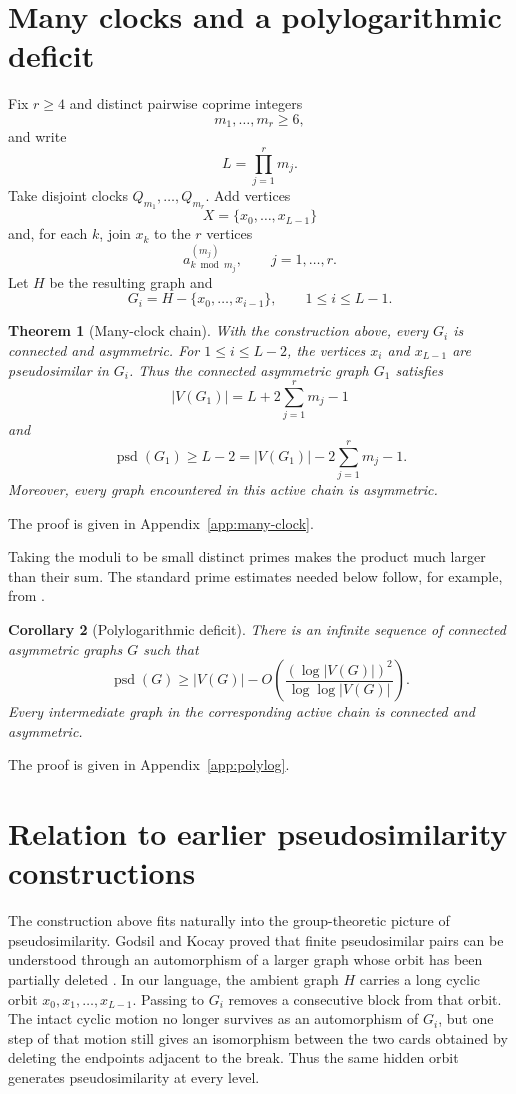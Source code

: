 \documentclass[11pt]{article}
\newtheorem{theorem}{Theorem}[section]
\newtheorem{corollary}[theorem]{Corollary}
\theoremstyle{definition}
\theoremstyle{remark}
\newcommand{\psd}{\operatorname{psd}}
\begin{document}
\section{Many clocks and a polylogarithmic deficit}

Fix $r\ge4$ and distinct pairwise coprime integers
\[
    m_1,\ldots,m_r\ge6,
\]
and write
\[
    L=\prod_{j=1}^r m_j.
\]
Take disjoint clocks $Q_{m_1},\ldots,Q_{m_r}$. Add vertices
\[
    X=\{x_0,\ldots,x_{L-1}\}
\]
and, for each $k$, join $x_k$ to the $r$ vertices
\[
    a^{(m_j)}_{k\bmod m_j},\qquad j=1,\ldots,r.
\]
Let $H$ be the resulting graph and
\[
    G_i=H-\{x_0,\ldots,x_{i-1}\},
    \qquad 1\le i\le L-1.
\]

\begin{theorem}[Many-clock chain]\label{thm:many-clock}
With the construction above, every $G_i$ is connected and asymmetric. For $1\le i\le L-2$, the vertices $x_i$ and $x_{L-1}$ are pseudosimilar in $G_i$. Thus the connected asymmetric graph $G_1$ satisfies
\[
    |V(G_1)|=L+2\sum_{j=1}^r m_j-1
\]
and
\[
    \psd(G_1)\ge L-2
    =|V(G_1)|-2\sum_{j=1}^r m_j-1.
\]
Moreover, every graph encountered in this active chain is asymmetric.
\end{theorem}


\par\noindent The proof is given in Appendix~\ref{app:many-clock}.


Taking the moduli to be small distinct primes makes the product much larger than their sum. The standard prime estimates needed below follow, for example, from \citet{RosserSchoenfeld1962}.

\begin{corollary}[Polylogarithmic deficit]\label{cor:polylog}
There is an infinite sequence of connected asymmetric graphs $G$ such that
\[
    \psd(G)
    \ge |V(G)|-
    O\!\left(\frac{(\log |V(G)|)^2}{\log\log |V(G)|}\right).
\]
Every intermediate graph in the corresponding active chain is connected and asymmetric.
\end{corollary}


\par\noindent The proof is given in Appendix~\ref{app:polylog}.


\section{Relation to earlier pseudosimilarity constructions}

The construction above fits naturally into the group-theoretic picture of pseudosimilarity. Godsil and Kocay proved that finite pseudosimilar pairs can be understood through an automorphism of a larger graph whose orbit has been partially deleted \cite{GodsilKocay1982}. In our language, the ambient graph $H$ carries a long cyclic orbit $x_0,x_1,\ldots,x_{L-1}$. Passing to $G_i$ removes a consecutive block from that orbit. The intact cyclic motion no longer survives as an automorphism of $G_i$, but one step of that motion still gives an isomorphism between the two cards obtained by deleting the endpoints adjacent to the break. Thus the same hidden orbit generates pseudosimilarity at every level.
\end{document}
